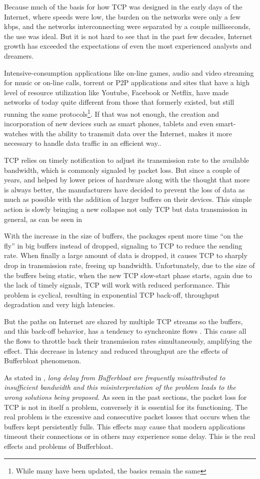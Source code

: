 Because much of the basis for how TCP was designed in the early days of the
Internet, where speeds were low, the burden on the networks were only a few
kbps, and the networks interconnecting were separated by a couple
milliseconds, the use was ideal. But it is not hard to see that in the past
few decades, Internet growth has exceeded the expectations of even the most
experienced analysts and dreamers.

Intensive-consumption applications like on-line games, audio and video
streaming for music or on-line calls, torrent or P2P applications and 
sites that have a high level of resource utilization like Youtube, Facebook or
Netflix, have made networks of today quite different from those that formerly
existed, but still running the same protocols\footnote{While many have been
updated, the basics remain the same}. If that was not enough, the creation and
incorporation of new devices such as smart phones, tablets and even smart-watches
with the ability to transmit data over the Internet, makes it more necessary to handle data traffic in an efficient way..

TCP relies on timely notification to adjust its transmission rate to the
available bandwidth, which is commonly signaled by packet loss. But since a
couple of years, and helped by lower prices of hardware along
with the thought that more is always better, the manufacturers have decided to
prevent the loss of data as much as possible with the addition of larger buffers on
their devices. This simple action is slowly bringing a new collapse not only
TCP but data transmission in general, as can be seen in \cite{CACMStaff}

With the increase in the size of buffers, the packages spent more time
``on the fly'' in big buffers instead of dropped, signaling to TCP to
reduce the sending rate. When finally a large amount of data is dropped,
it causes TCP to
sharply drop in transmission rate, freeing up bandwidth. Unfortunately, due to
the size of the buffers being static, when the new TCP slow-start phase starts,
again due to the lack of timely signals, TCP will work with reduced
performance. This problem is cyclical, resulting in exponential TCP back-off,
throughput degradation and very high latencies.

But the paths on Internet are shared by multiple TCP streams so the buffers,
and this back-off behavior, has a tendency to synchronize flows
\cite{main:ref:1}. This cause all the flows to throttle back their
transmission rates simultaneously, amplifying the effect. This decrease in
latency and reduced throughput are the effects of Bufferbloat phenomenon.

As stated in \cite{GettysNichols}, \textit{long delay from Bufferbloat are
frequently misattributed to insufficient bandwidth and this misinterpretation
of the problem leads to the wrong solutions being proposed}. As seen in the
past sections, the packet loss for TCP is not in itself a problem, conversely
it is essential for its functioning. The real problem is  the excessive and
consecutive packet losses that occurs when the buffers kept persistently
fulls. This effects may cause that modern applications timeout their
connections or in others may experience some delay. This is the real
effects and problems of Bufferbloat.
